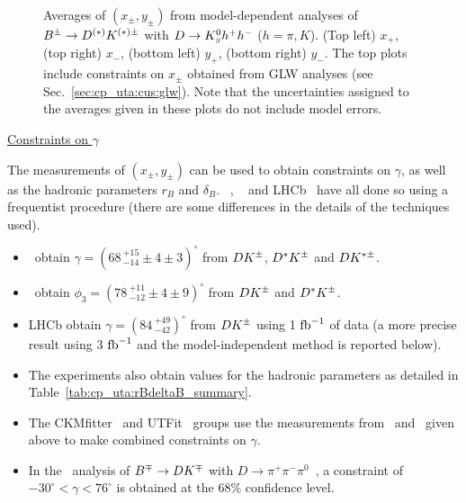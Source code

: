 \begin{figure}[htb]
\begin{center}
{    }
  \end{center}
  \vspace{-0.8cm}
  \caption{
    Averages of $(x_\pm, y_\pm)$ from model-dependent analyses of $B^\pm \to
    D^{(*)}K^{(*)\pm}$ with $D \to K^0_{\scriptscriptstyle S} h^+h^-$ ($h=\pi,K$).
    (Top left) $x_+$, (top right) $x_-$,
    (bottom left) $y_+$, (bottom right) $y_-$.
    The top plots include constraints on $x_{\pm}$ obtained from GLW analyses (see Sec.~\ref{sec:cp_uta:cus:glw}).
    Note that the uncertainties assigned to the averages given in these plots
    do not include model errors.        
  }
  \label{fig:cp_uta:cus:dalitz_1d}
\end{figure}

\vspace{3ex}

\noindent
\underline{Constraints on $\gamma$}

The measurements of $(x_\pm, y_\pm)$ can be used to obtain constraints on 
$\gamma$, as well as the hadronic parameters $r_B$ and $\delta_B$.
\babar~\cite{delAmoSanchez:2010rq},
\belle~\cite{Poluektov:2010wz,Poluektov:2006ia} and
LHCb~\cite{Aaij:2014iba}
have all done so using a frequentist procedure 
(there are some differences in the details of the techniques used).

\begin{itemize}\setlength{\itemsep}{0.5ex}

\item 
  \babar\ obtain $\gamma = (68 \,^{+15}_{-14} \pm 4 \pm 3)^\circ$
  from $DK^\pm$, $D^*K^\pm$ and $DK^{*\pm}$.

\item
  \belle\ obtain $\phi_3 = (78 \,^{+11}_{-12} \pm 4 \pm 9)^\circ$
  from $DK^\pm$ and $D^*K^\pm$.

\item 
  LHCb obtain $\gamma = (84 \,^{+49}_{-42})^\circ$
  from $DK^\pm$ using 1 ${\rm fb}^{-1}$ of data (a more precise result using 3 ${\rm fb}^{-1}$ and the model-independent method is reported below).

\item
  The experiments also obtain values for the hadronic parameters as detailed
  in Table~\ref{tab:cp_uta:rBdeltaB_summary}.


\item 
  The CKMfitter~\cite{Charles:2004jd} and 
  UTFit~\cite{Bona:2005vz} groups use the measurements 
  from \belle\ and \babar\ given above
  to make combined constraints on $\gamma$.

\item 
  In the \babar\ analysis of $B^\mp \to DK^\mp$ with 
  $D \to \pi^+\pi^-\pi^0$~\cite{Aubert:2007ii},
  a constraint of $-30^\circ < \gamma < 76^\circ$ is obtained 
  at the 68\% confidence level.

\end{itemize}

